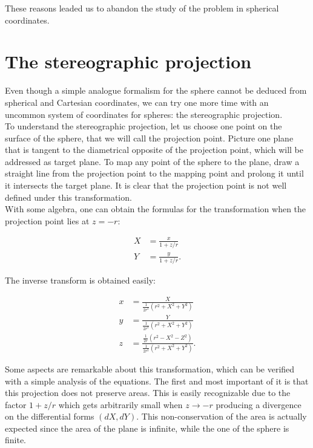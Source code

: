 These reasons leaded us to abandon the study of the problem in spherical coordinates.


\section{The stereographic projection}

Even though a simple analogue formalism for the sphere cannot be deduced from spherical and Cartesian coordinates, we can try one more time with an uncommon system of coordinates for spheres: the stereographic projection.\\

To understand the stereographic projection, let us choose one point on the surface of the sphere, that we will call the projection point. Picture one plane that is tangent to the diametrical opposite of the projection point, which will be addressed as target plane. To map any point of the sphere to the plane, draw a straight line from the projection point to the mapping point and prolong it until it intersects the target plane. It is clear that the projection point is not well defined under this transformation.\\

With some algebra, one can obtain the formulas for the transformation when the projection point lies at $z=-r$:

\begin{align*}
X &= \frac{x}{1+z/r}\\
Y &= \frac{y}{1+z/r}.
\end{align*}

The inverse transform is obtained easily:

\begin{align*}
x &= \frac{X}{\frac{1}{2r^2}(r^2+X^2+Y^2)}\\
y &= \frac{Y}{\frac{1}{2r^2}(r^2+X^2+Y^2)}\\
z &= \frac{\frac{1}{2r}(r^2-X^2-Z^2)}{\frac{1}{2r^2}(r^2+X^2+Y^2)}.
\end{align*}

Some aspects are remarkable about this transformation, which can be verified with a simple analysis of the equations. The first and most important of it is that this projection does not preserve areas. This is easily recognizable due to the factor $1+z/r$ which gets arbitrarily small when $z\to -r$ producing a divergence on the differential forms $(dX,dY)$. This non-conservation of the area is actually expected since the area of the plane is infinite, while the one of the sphere is finite.\\

